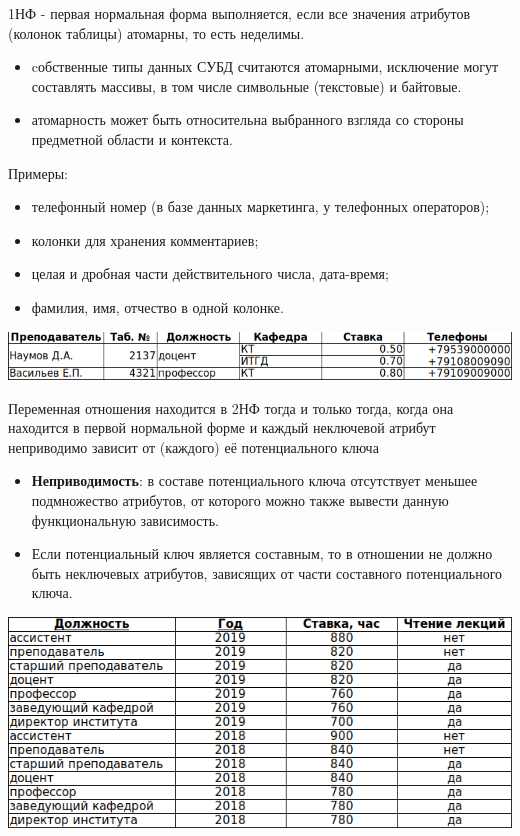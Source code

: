 \documentclass{beamer}
\begin{document}
\begin{frame}
\begin{block}{1НФ - первая нормальная форма}
выполняется, если все значения атрибутов (колонок таблицы) атомарны, то есть неделимы.
\end{block}
\begin{itemize}
\item cобственные типы данных СУБД считаются атомарными, исключение
могут составлять массивы, в том числе символьные (текстовые) и байтовые.
\item атомарность может быть относительна выбранного взгляда со стороны предметной области и контекста. 
\end{itemize}
Примеры:
\begin{itemize}
\item телефонный номер (в базе данных маркетинга, у телефонных операторов);
\item колонки для хранения комментариев;
\item целая и дробная части действительного числа, дата-время;
\item фамилия, имя, отчество в одной колонке.
\end{itemize}
\begin{center}
\includegraphics[scale=1.5]{images/ex-rasp-06.png}
\end{center}
\end{frame} 

\begin{frame}
\begin{block}{Переменная отношения находится в 2НФ}
тогда и только тогда, когда она находится в первой нормальной форме и каждый неключевой атрибут неприводимо зависит от (каждого) её потенциального ключа
\end{block}
\begin{itemize}
\item \textbf{Неприводимость}: в составе потенциального ключа отсутствует меньшее подмножество атрибутов, от которого можно также вывести данную функциональную зависимость.
\item Если потенциальный ключ является составным, то в отношении не должно быть неключевых атрибутов, зависящих от части составного потенциального ключа. 
\end{itemize}
\begin{center}
\includegraphics[scale=1.4]{images/ex-rasp-07.png}
\end{center}
\end{frame}
\end{document}
